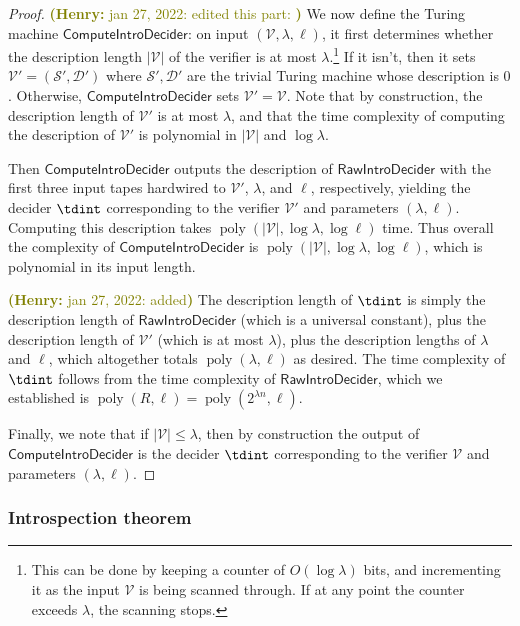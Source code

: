 \documentclass[11pt]{article}
\theoremstyle{definition}
\DeclareMathOperator{\poly}{poly}
\newcommand{\abs}[1]{\left\vert {#1} \right\vert}
\newcommand{\sampler}{\mathcal{S}}
\newcommand{\decider}{\mathcal{D}}
\newcommand{\verifier}{\mathcal{V}}
\newcommand{\tmstyle}[1]{\ensuremath{\mathsf{#1}}}
\newcommand{\RawIntroDecider}{\tmstyle{RawIntroDecider}}
\newcommand{\ComputeIntroDecider}{\tmstyle{ComputeIntroDecider}}
\newcommand{\hnote}[1]{\textcolor{olive}{\small {\textbf{(Henry:} #1\textbf{) }}}}
\newcommand{\hnote}[1]{}
\begin{document}
\begin{proof}
  \hnote{jan 27, 2022: edited this part: }We now define the Turing machine $\ComputeIntroDecider$: on input
  $(\verifier,\lambda,\ell)$, it first determines whether the description length
	$|\verifier|$ of the verifier is at most $\lambda$.\footnote{This can be done by keeping a counter of $O(\log \lambda)$ bits, and incrementing it as the input $\verifier$ is being scanned through. If at any point the counter exceeds $\lambda$, the scanning stops.} If it isn't, then it sets $\verifier' = (\sampler',\decider')$ 
	where $\sampler',\decider'$ are the trivial Turing machine whose description is $0$. Otherwise,
  $\ComputeIntroDecider$ sets $\verifier' = \verifier$. Note that by construction, the description length of $\verifier'$ is at most $\lambda$, 
  and that the time complexity of computing the description of $\verifier'$ is polynomial in $|\verifier|$ and $\log \lambda$.
  
  Then $\ComputeIntroDecider$ outputs the description of
  $\RawIntroDecider$ with the first three input tapes hardwired to
  $\verifier'$, $\lambda$, and $\ell$, respectively, yielding the decider
  $\tdint$ corresponding to the verifier $\verifier'$ and
  parameters $(\lambda, \ell)$. 
  Computing this description takes $\poly(\abs{\verifier}, \log\lambda, \log
  \ell)$ time. Thus overall the complexity of $\ComputeIntroDecider$ is $\poly(\abs{\verifier},\log \lambda,\log \ell)$, which is polynomial in its input length.
  
  \hnote{jan 27, 2022: added} The description length of $\tdint$ is simply the description length of $\RawIntroDecider$ (which is a universal constant),
  plus the description length of $\verifier'$ (which is at most $\lambda$), plus the description lengths of $\lambda$ and $\ell$, which altogether
  totals $\poly(\lambda, \ell)$ as desired. The time complexity of $\tdint$ follows from the time complexity of $\RawIntroDecider$, which we established is $\poly(R, \ell) = \poly(2^{\lambda n},\ell)$.
  
  Finally, we note that if $|\verifier| \leq \lambda$, then by construction the output of $\ComputeIntroDecider$ is the decider $\tdint$ corresponding to the verifier $\verifier$ and parameters $(\lambda,\ell)$.
\end{proof}

\subsubsection{Introspection theorem}
\label{sec:intro-theorem}
\end{document}
